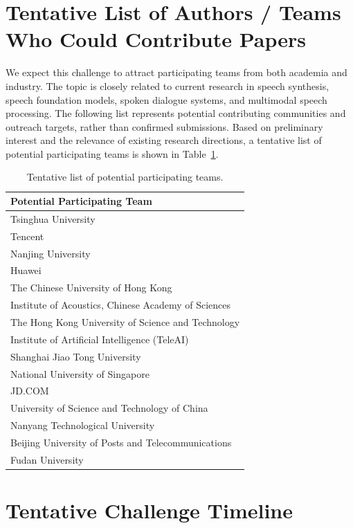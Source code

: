 \documentclass[a4paper]{article}
\begin{document}
\section{Tentative List of Authors / Teams Who Could Contribute Papers}

We expect this challenge to attract participating teams from both academia and industry. The topic is closely related to current research in speech synthesis, speech foundation models, spoken dialogue systems, and multimodal speech processing. The following list represents potential contributing communities and outreach targets, rather than confirmed submissions. Based on preliminary interest and the relevance of existing research directions, a tentative list of potential participating teams is shown in Table~\ref{tab:contributors}.

\begin{table}[h]
\caption{Tentative list of potential participating teams.}
\label{tab:contributors}
\centering
\small
\begin{tabular}{l}
\toprule
\textbf{Potential Participating Team} \\
\midrule
Tsinghua University \\
Tencent \\
Nanjing University \\
Huawei \\
The Chinese University of Hong Kong \\
Institute of Acoustics, Chinese Academy of Sciences \\
The Hong Kong University of Science and Technology \\
Institute of Artificial Intelligence (TeleAI) \\
Shanghai Jiao Tong University \\
National University of Singapore \\
JD.COM \\
University of Science and Technology of China \\
Nanyang Technological University \\
Beijing University of Posts and Telecommunications \\
Fudan University \\
\bottomrule
\end{tabular}
\end{table}


\section{Tentative Challenge Timeline}
\end{document}
